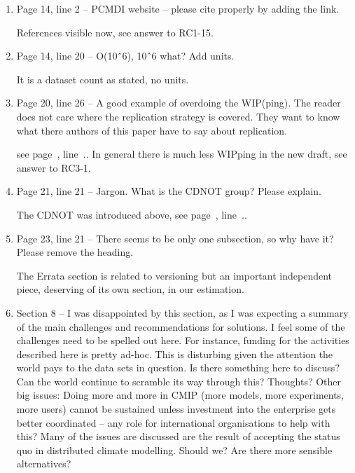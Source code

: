 \documentclass[gmd,manuscript]{copernicus}
\newcommand{\plref}[1]{see page~\pageref{p-#1}, line~\lineref{l-#1}.}
\newenvironment{answer}{\color{blue}}{}
\begin{document}
\begin{enumerate}[label=RC3-\arabic*,leftmargin=*]
  \begin{answer}
    \plref{RC3-18}
  \end{answer}
\item Page 14, line 2 -- PCMDI website -- please cite properly by adding
  the link.

  \begin{answer}
    References visible now, see answer to RC1-15.
  \end{answer}
\item Page 14, line 20 -- O(10ˆ6), 10ˆ6 what? Add units.

  \begin{answer}
    It is a dataset count as stated, no units.
  \end{answer}
\item Page 20, line 26 -- A good example of overdoing the WIP(ping).
  The reader does not care where the replication strategy is covered.
  They want to know what there authors of this paper have to say about
  replication.

  \begin{answer}
    \plref{RC3-21}. In general there is much less WIPping in the new
    draft, see answer to RC3-1.
  \end{answer}
\item Page 21, line 21 -- Jargon. What is the CDNOT group? Please
  explain.

  \begin{answer}
    The CDNOT was introduced above, \plref{RC3-22}.
  \end{answer}
\item Page 23, line 21 -- There seems to be only one subsection, so why
  have it? Please remove the heading.

  \begin{answer}
    The Errata section is related to versioning but an important
    independent piece, deserving of its own section, in our
    estimation.
  \end{answer}
\item Section 8 -- I was disappointed by this section, as I was
  expecting a summary of the main challenges and recommendations for
  solutions. I feel some of the challenges need to be spelled out
  here. For instance, funding for the activities described here is
  pretty ad-hoc. This is disturbing given the attention the world pays
  to the data sets in question. Is there something here to discuss?
  Can the world continue to scramble its way through this? Thoughts?
  Other big issues: Doing more and more in CMIP (more models, more
  experiments, more users) cannot be sustained unless investment into
  the enterprise gets better coordinated -- any role for international
  organisations to help with this? Many of the issues are discussed
  are the result of accepting the status quo in distributed climate
  modelling. Should we? Are there more sensible alternatives?


\end{enumerate}
\end{document}
